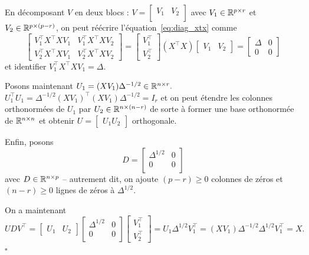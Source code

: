 En décomposant $V$ en deux blocs : $V =
\begin{bmatrix}
  V_1 & V_2 \\
\end{bmatrix}$ avec $V_1 \in \mathbb{R}^{p \times r}$ et $V_2 \in \mathbb{R}^{p \times (p-r)}$, on peut réécrire l'équation~\eqref{eq:diag_xtx} comme
\begin{equation*}
  \begin{bmatrix}
    V_1^\top X^\top X V_1 & V_1^\top X^\top X V_2 \\
    V_2^\top X^\top X V_1 & V_2^\top X^\top X V_2
  \end{bmatrix} =  
  \begin{bmatrix}
    V_1^\top \\
    V_2^\top
  \end{bmatrix}  \left( X^\top X\right) 
  \begin{bmatrix}
    V_1 & V_2
  \end{bmatrix} =
  \begin{bmatrix}
    \Delta & 0 \\
    0 & 0
  \end{bmatrix}
\end{equation*}
et identifier $V_1^\top X^\top X V_1 = \Delta$.

Posons maintenant $U_1 = (X V_1) \Delta^{-1/2} \in \mathbb{R}^{n \times r}.$
$U_1^\top U_1 = \Delta^{-1/2} (X V_1)^\top  (X V_1) \Delta^{-1/2} = I_r$ et on peut étendre les colonnes orthonormées de $U_1$ par $U_2 \in \mathbb{R}^{n \times (n-r)}$ de sorte à former une base orthonormée de $\mathbb{R}^{n \times n}$ et obtenir $U =
\begin{bmatrix}
  U_1 U_2
\end{bmatrix}$ orthogonale.

Enfin, posons
\begin{equation*}
  D =
  \begin{bmatrix}
    \Delta^{1/2} & 0 \\
    0 & 0 \\
  \end{bmatrix}
\end{equation*}
avec $D \in \mathbb{R}^{n \times p}$ -- autrement dit, on ajoute $(p-r) \geq 0$ colonnes de zéros
et $(n-r) \geq 0$ lignes de zéros à $\Delta^{1/2}$.

On a maintenant
\begin{equation*}
  U D V^\top =
  \begin{bmatrix}
    U_1 & U_2
  \end{bmatrix}   \begin{bmatrix}
    \Delta^{1/2} & 0 \\
    0 & 0 \\
  \end{bmatrix}
  \begin{bmatrix}
    V_1^\top \\
    V_2^\top
  \end{bmatrix} = U_1 \Delta^{1/2} V_1^\top = (X V_1) \Delta^{-1/2} \Delta^{1/2} V_1^\top = X.
\end{equation*} \hfill $\square$


